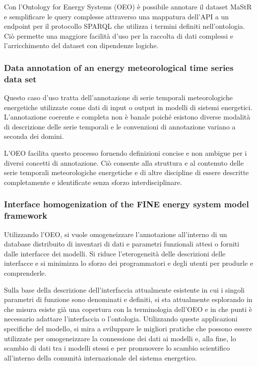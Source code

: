Con l'Ontology
for Energy Systems (OEO) è possibile annotare il dataset MaStR e semplificare
le query complesse attraverso una mappatura dell'API a un endpoint per il
protocollo SPARQL che utilizza i termini definiti nell'ontologia. Ciò permette
una maggiore facilità d'uso per la raccolta di dati complessi e l'arricchimento
del dataset con dipendenze logiche.

\subsubsection{Data annotation of an energy meteorological time series data
      set}

Questo caso d'uso tratta dell'annotazione di serie temporali meteorologiche
energetiche utilizzate come
dati di input o output in modelli di sistemi energetici. L'annotazione coerente
e completa non è banale poiché esistono diverse modalità
di descrizione delle serie temporali e le convenzioni di annotazione variano a
seconda dei domini.

L'OEO facilita questo processo fornendo definizioni concise e non ambigue per i
diversi concetti di annotazione. Ciò consente alla struttura e al contenuto
delle serie temporali meteorologiche energetiche e di altre discipline di
essere descritte completamente e identificate senza sforzo interdisciplinare.

\subsubsection{Interface homogenization of the FINE energy system model
      framework}

Utilizzando l'OEO, si vuole omogeneizzare l'annotazione all'interno di un
database distribuito di inventari di dati e parametri funzionali attesi o
forniti dalle interfacce dei modelli.
Si riduce l'eterogeneità delle descrizioni delle interfacce e si minimizza lo
sforzo dei programmatori e
degli utenti per produrle e comprenderle.

Sulla base della descrizione dell'interfaccia attualmente esistente in cui i
singoli parametri di funzione sono denominati e definiti, si sta attualmente
esplorando in che misura esiste già una copertura con la terminologia dell'OEO
e in che punti è necessario adattare l'interfaccia o l'ontologia. Utilizzando
queste applicazioni specifiche del modello, si mira a sviluppare le migliori
pratiche che possono essere utilizzate per omogeneizzare la connessione dei
dati ai modelli e, alla fine, lo scambio di dati tra i modelli stessi e per
promuovere lo scambio scientifico all'interno della comunità internazionale del
sistema energetico.

